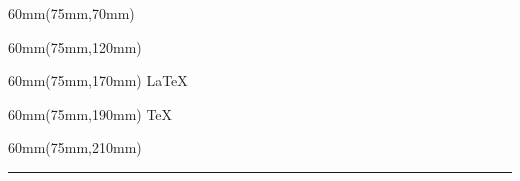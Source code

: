 \documentclass{article}
\begin{document}
\begin{textblock*}{60mm}(75mm,70mm)
\noindent\fbox{\begin{minipage}{50mm}\centering\Huge\textbf{\LaTeX}\end{minipage}}
\end{textblock*}
\begin{textblock*}{60mm}(75mm,120mm)
\noindent{}
\end{textblock*}
\begin{textblock*}{60mm}(75mm,170mm)
\LaTeX
\end{textblock*}
\begin{textblock*}{60mm}(75mm,190mm)
\TeX
\end{textblock*}
\begin{textblock*}{60mm}(75mm,210mm)
\strut\rule{1cm}{1pt}
\end{textblock*}
\end{document}
